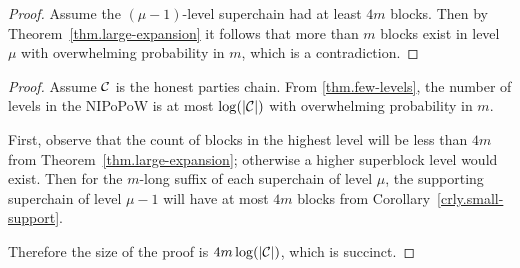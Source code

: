 \restateThmSmallSupport*

\begin{proof}
    Assume the $(\mu - 1)$-level superchain had at least $4m$ blocks. Then by
    Theorem~\ref{thm.large-expansion} it follows that more than $m$ blocks
    exist in level $\mu$ with overwhelming probability in $m$, which is a
    contradiction.
\end{proof}

\restateThmSuccinctness*

\begin{proof}
    Assume $\mathcal{C}$ is the honest parties chain. From \ref{thm.few-levels}, the
    number of levels in the NIPoPoW is at most $\log(|\mathcal{C}|)$ with
    overwhelming probability in $m$.

    First, observe that the count of blocks in the highest level will be less
    than $4m$ from Theorem~\ref{thm.large-expansion}; otherwise a higher
    superblock level would exist. Then for the $m$-long suffix of each
    superchain of level $\mu$, the supporting superchain of level $\mu - 1$
    will have at most $4m$ blocks from Corollary~\ref{crly.small-support}.

    Therefore the size of the proof is $4m \log(|\mathcal{C}|)$, which is succinct.
\end{proof}
